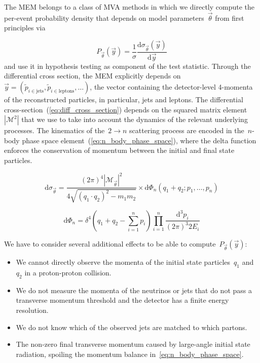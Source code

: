 The MEM belongs to a class of MVA methods in which we directly compute the per-event probability density that depends on model parameters~$\vec{\theta}$ from first principles via

\begin{equation}
P_{\vec{\theta}}(\vec{y}) = \frac{1}{\sigma}
\frac{\mathrm{d}\sigma_{\vec{\theta}}(\vec{y})}{\mathrm{d}\vec{y}}
\end{equation}
and use it in hypothesis testing as component of the test statistic. Through the differential cross section, the MEM explicitly depends on~$\vec{y} = (\tilde{p}_{i \in \mathrm{jets}}, \tilde{p}_{i \in \mathrm{leptons}}, \dots)$, the vector containing the detector-level 4-momenta of the reconstructed particles, in particular, jets and leptons. The differential cross-section~(\cref{eq:diff_cross_section}) depends on the squared matrix element~$|\mathcal{M}^2|$ that we use to take into account the dynamics of the relevant underlying processes. The kinematics of the~$2 \rightarrow n$ scattering process are encoded in the~$n$-body phase space element~(\cref{eq:n_body_phase_space}), where the delta function enforces the conservation of momentum between the initial and final state particles.

\begin{equation}
\label{eq:diff_cross_section}
\mathrm{d}\sigma_{\vec{\theta}} = \frac{(2\pi)^4 |\mathcal{M}_{\vec{\theta}}|^2}{4 \sqrt{(q_1 \cdot q_2)^2 - m_1 m_2}} \times
\mathrm{d}\Phi_n(q_1 + q_2; p_1, \dots, p_{n})
\end{equation}

\begin{equation}
\label{eq:n_body_phase_space}
\mathrm{d}\Phi_n = \delta^4 (q_1 + q_2 - \sum_{i=1}^n p_i) \prod_{i=1}^n \frac{\mathrm{d}^3 p_i}{(2\pi)^3 2 E_i}
\end{equation}

We have to consider several additional effects to be able to compute~$P_{\vec{\theta}}(\vec{y})$:
\begin{itemize}
\item We cannot directly observe the momenta of the initial state particles~$q_1$ and~$q_2$ in a proton-proton collision.
\item We do not measure the momenta of the neutrinos or jets that do not pass a transverse momentum threshold and the detector has a finite energy resolution.
\item We do not know which of the observed jets are matched to which partons.
\item The non-zero final transverse momentum caused by large-angle initial state radiation, spoiling the momentum balance in~\cref{eq:n_body_phase_space}.
\end{itemize}

